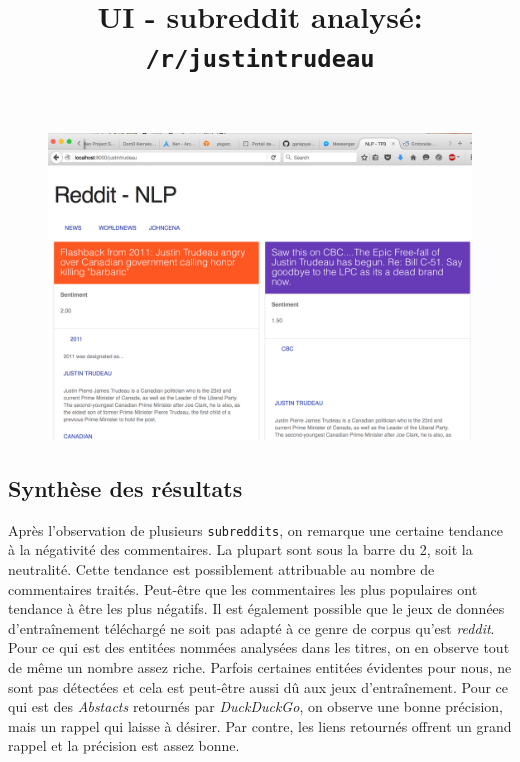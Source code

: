 \documentclass[12pt]{article}
\begin{document}
\begin{figure}[H]
  \begin{center}
    \title{UI - subreddit analysé: \verb;/r/justintrudeau;}
  \end{center}
  \includegraphics[width=18cm]{fig/ui-example.png}
  \label{fig:ui-example}
\end{figure}

\subsection{Synthèse des résultats}

Après l'observation de plusieurs \verb;subreddits;, on remarque une certaine tendance à la négativité des commentaires. La plupart sont sous la barre du 2, soit la neutralité. Cette tendance est possiblement attribuable au nombre de commentaires traités. Peut-être que les commentaires les plus populaires ont tendance à être les plus négatifs. Il est également possible que le jeux de données d'entraînement téléchargé ne soit pas adapté à ce genre de corpus qu'est \textit{reddit}. Pour ce qui est des entitées nommées analysées dans les titres, on en observe tout de même un nombre assez riche. Parfois certaines entitées évidentes pour nous, ne sont pas détectées et cela est peut-être aussi dû aux jeux d'entraînement. Pour ce qui est des \textit{Abstacts} retournés par \textit{DuckDuckGo}, on observe une bonne précision, mais un rappel qui laisse à désirer. Par contre, les liens retournés offrent un grand rappel et la précision est assez bonne.

\end{document}
